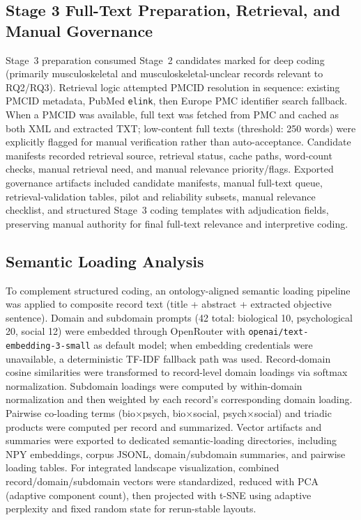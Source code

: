 \documentclass[11pt]{article}
\begin{document}
\subsection{Stage 3 Full-Text Preparation, Retrieval, and Manual Governance}
Stage~3 preparation consumed Stage~2 candidates marked for deep coding (primarily musculoskeletal and musculoskeletal-unclear records relevant to RQ2/RQ3). Retrieval logic attempted PMCID resolution in sequence: existing PMCID metadata, PubMed \texttt{elink}, then Europe PMC identifier search fallback. When a PMCID was available, full text was fetched from PMC and cached as both XML and extracted TXT; low-content full texts (threshold: 250 words) were explicitly flagged for manual verification rather than auto-acceptance. Candidate manifests recorded retrieval source, retrieval status, cache paths, word-count checks, manual retrieval need, and manual relevance priority/flags. Exported governance artifacts included candidate manifests, manual full-text queue, retrieval-validation tables, pilot and reliability subsets, manual relevance checklist, and structured Stage~3 coding templates with adjudication fields, preserving manual authority for final full-text relevance and interpretive coding.

\subsection{Semantic Loading Analysis}
To complement structured coding, an ontology-aligned semantic loading pipeline was applied to composite record text (title + abstract + extracted objective sentence). Domain and subdomain prompts (42 total: biological 10, psychological 20, social 12) were embedded through OpenRouter with \texttt{openai/text-embedding-3-small} as default model; when embedding credentials were unavailable, a deterministic TF-IDF fallback path was used. Record-domain cosine similarities were transformed to record-level domain loadings via softmax normalization. Subdomain loadings were computed by within-domain normalization and then weighted by each record's corresponding domain loading. Pairwise co-loading terms (bio$\times$psych, bio$\times$social, psych$\times$social) and triadic products were computed per record and summarized. Vector artifacts and summaries were exported to dedicated semantic-loading directories, including NPY embeddings, corpus JSONL, domain/subdomain summaries, and pairwise loading tables. For integrated landscape visualization, combined record/domain/subdomain vectors were standardized, reduced with PCA (adaptive component count), then projected with t-SNE using adaptive perplexity and fixed random state for rerun-stable layouts.
\end{document}
